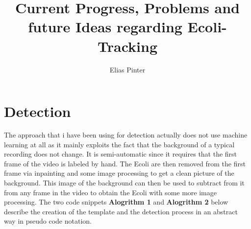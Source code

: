 \documentclass{article}
\title{Current Progress, Problems and future Ideas regarding Ecoli-Tracking}
\author{Elias Pinter}
\begin{document}
\maketitle

\section{Detection}
The approach that i have been using for detection actually does not use machine learning at all as it mainly exploits the fact
that the background of a typical recording does not change. It is semi-automatic since it requires that the first frame of the video
is labeled by hand. The Ecoli are then removed from the first frame via inpainting and some image processing to get a clean picture
of the background. This image of the background can then be used to subtract from it from any frame in the video to obtain the Ecoli with some
more image processing. The two code snippets \textbf{Alogrithm 1} and  \textbf{Alogrithm 2} below describe the creation of the template and
the detection process in an abstract way in pseudo code notation.


\end{document}
